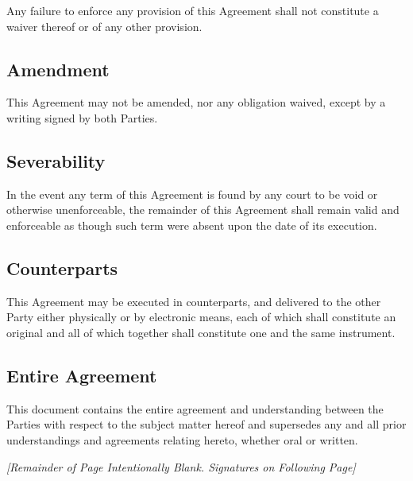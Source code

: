 \documentclass[a4paper,12pt]{article} %
\begin{document}
Any failure to enforce any provision of this Agreement shall not constitute a waiver thereof or of any other provision.

\subsection{Amendment}

This Agreement may not be amended, nor any obligation waived, except by a writing signed by both Parties.

\subsection{Severability}

In the event any term of this Agreement is found by any court to be void or otherwise unenforceable, the remainder of this Agreement shall remain valid and enforceable as though such term were absent upon the date of its execution.

\subsection{Counterparts}

This Agreement may be executed in counterparts, and delivered to the other Party either physically or by electronic means, each of which shall constitute an original and all of which together shall constitute one and the same instrument.

\subsection{Entire Agreement}

This document contains the entire agreement and understanding between the Parties with respect to the subject matter hereof and supersedes any and all prior understandings and agreements relating hereto, whether oral or written.\\

\begin{center}
\textit{[Remainder of Page Intentionally Blank. Signatures on Following Page]}
\end{center}

\pagebreak


\end{document}
